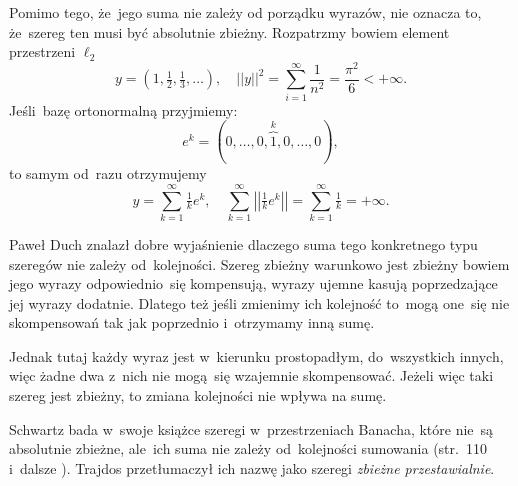 \documentclass[a4paper,11pt]{article}
\newcommand{\ld}{\ldots}
\newcommand{\fr}{\frac}
\newcommand{\tfr}{\tfrac}
\newcommand{\Sum}{\sum\limits}
\newcommand{\norm}[1]{\left|\left| #1 \right|\right|}
\newcommand{\lcd}{\ell_{ 2 }} %
\begin{document}
Pomimo tego, że~jego suma nie zależy od porządku wyrazów, nie oznacza
to, że~szereg ten musi być absolutnie zbieżny. Rozpatrzmy bowiem
element przestrzeni $\lcd$
\begin{equation*}
  y = ( 1, \tfr{ 1 }{ 2 }, \tfr{ 1 }{ 3 },\ld ), \quad
  \norm{ y }^{ 2 } = \Sum_{ i = 1 }^{ \infty } \fr{ 1 }{ n^{ 2 } }
  = \fr{ \pi^{ 2 } }{ 6 } < +\infty.
\end{equation*}
Jeśli~bazę ortonormalną przyjmiemy:
\begin{equation*}
  e^{ k } = ( 0, \ld, 0, \overbrace{ 1 }^{ k }, 0, \ld, 0),
\end{equation*}
to samym od~razu otrzymujemy
\begin{equation*}
  y = \Sum_{ k = 1 }^{ \infty } \tfr{ 1 }{ k } e^{ k }, \quad
  \Sum_{ k = 1 }^{ \infty } \norm{ \tfr{ 1 }{ k } e^{ k } }
  = \Sum_{ k = 1 }^{ \infty } \tfr{ 1 }{ k } = +\infty.
\end{equation*}

Paweł Duch znalazł dobre wyjaśnienie dlaczego suma tego konkretnego
typu szeregów nie zależy od~kolejności. Szereg zbieżny warunkowo jest
zbieżny bowiem jego wyrazy odpowiednio~się kompensują, wyrazy ujemne
kasują poprzedzające jej wyrazy dodatnie. Dlatego też jeśli zmienimy
ich kolejność to~mogą one~się nie skompensowań tak jak poprzednio
i~otrzymamy inną sumę.

Jednak tutaj każdy wyraz jest w~kierunku prostopadłym, do~wszystkich
innych, więc żadne dwa z~nich nie mogą~się wzajemnie skompensować.
Jeżeli więc taki szereg jest zbieżny, to zmiana kolejności nie wpływa
na sumę.

Schwartz bada w~swoje książce szeregi w~przestrzeniach Banacha, które
nie~są absolutnie zbieżne, ale~ich suma nie zależy od~kolejności
sumowania (str.~110 i~dalsze \cite{Schwartz79}). Trajdos przetłumaczył
ich nazwę jako szeregi \emph{zbieżne
  przestawialnie}. %
\end{document}
